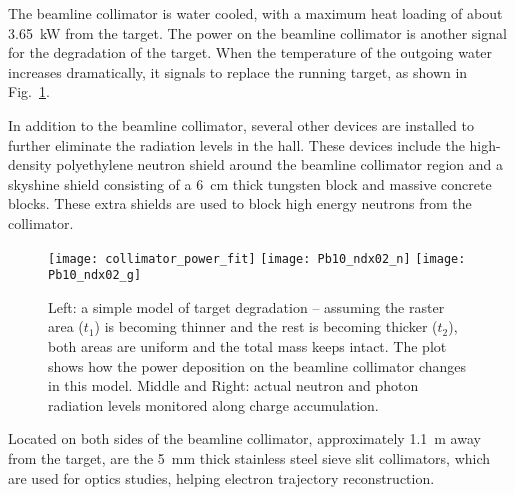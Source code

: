 The beamline collimator is water cooled, with a maximum heat loading of about 
3.65~kW from the \Pb target. The power on the beamline
collimator is another signal for the degradation of the target. When the temperature 
of the outgoing water increases dramatically, it signals to replace the running
\Pb target, as shown in Fig.~\ref{fig:collimator_see_target_degradation}.

In addition to the beamline collimator, several other devices are installed 
to further eliminate the radiation levels in the hall. These devices include the 
high-density polyethylene neutron shield around the beamline collimator
region and a skyshine shield consisting of a 6~cm thick tungsten block and
massive concrete blocks. These extra shields are used to block high energy
neutrons from the collimator.

\begin{figure}[!h]
    \texttt{[image: collimator\_power\_fit]}
    \texttt{[image: Pb10\_ndx02\_n]}
    \texttt{[image: Pb10\_ndx02\_g]}
    \caption[Target degradation]
    {Left: a simple model of target degradation -- assuming the raster 
    area ($t_1$) is becoming thinner and the rest is becoming thicker ($t_2$),
    both areas are uniform and the total mass keeps intact. The plot shows how the power 
    deposition on the beamline collimator changes in this model. Middle and Right: actual
    neutron and photon radiation levels monitored along charge accumulation.
    }
    \label{fig:collimator_see_target_degradation}
\end{figure}

Located on both sides of the beamline collimator, approximately 1.1~m away from
the target, are the 5~mm thick stainless steel sieve slit collimators, which    %
are used for optics studies, helping electron trajectory reconstruction. 


